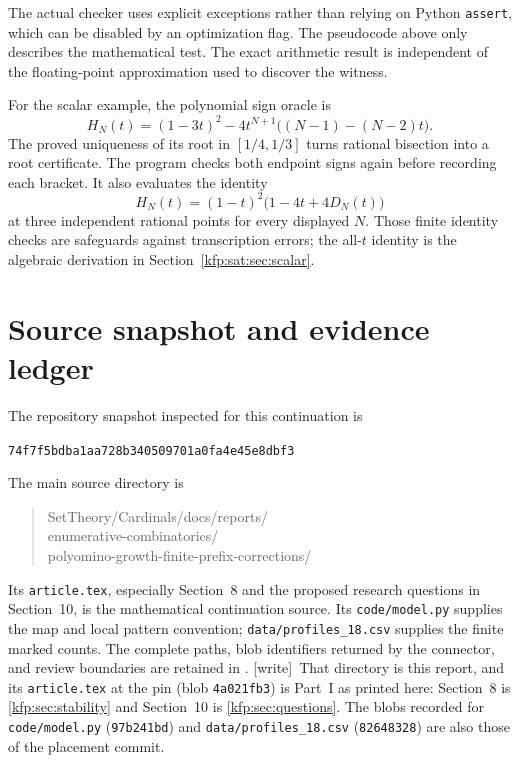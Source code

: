 \documentclass[11pt,a4paper]{article}
\theoremstyle{definition}
\theoremstyle{remark}
\newcommand{\wtag}{\textsf{\small[write]}}
\begin{document}
The actual checker uses explicit exceptions rather than relying on Python
\texttt{assert}, which can be disabled by an optimization flag. The
pseudocode above only describes the mathematical test. The exact
arithmetic result is independent of the floating-point approximation used
to discover the witness.

For the scalar example, the polynomial sign oracle is
\[
 H_N(t)=(1-3t)^2-4t^{N+1}\bigl((N-1)-(N-2)t\bigr).
\]
The proved uniqueness of its root in $[1/4,1/3]$ turns rational bisection
into a root certificate. The program checks both endpoint signs again
before recording each bracket. It also evaluates the identity
\[
 H_N(t)=(1-t)^2\bigl(1-4t+4D_N(t)\bigr)
\]
at three independent rational points for every displayed $N$. Those
finite identity checks are safeguards against transcription errors;
the all-$t$ identity is the algebraic derivation in
Section~\ref{kfp:sat:sec:scalar}.

\section{Source snapshot and evidence ledger}
\label{kfp:sat:app:sources}

The repository snapshot inspected for this continuation is
\begin{center}\small\texttt{74f7f5bdba1aa728b340509701a0fa4e45e8dbf3}\end{center}
The main source directory is
\begin{quote}\small\ttfamily
SetTheory/Cardinals/docs/reports/\\
enumerative-combinatorics/\\
polyomino-growth-finite-prefix-corrections/
\end{quote}
Its \texttt{article.tex}, especially Section~8 and the proposed research
questions in Section~10, is the mathematical continuation source. Its
\texttt{code/model.py} supplies the map and local pattern convention;
\texttt{data/profiles\_18.csv} supplies the finite marked counts.
The complete paths, blob identifiers returned by the connector, and
review boundaries are retained in .
\wtag\ That directory is this report, and its \texttt{article.tex} at the
pin (blob \texttt{4a021fb3}) is Part~I as printed here: Section~8 is
\cref{kfp:sec:stability} and Section~10 is \cref{kfp:sec:questions}. The
blobs recorded for \texttt{code/model.py} (\texttt{97b241bd}) and
\texttt{data/profiles\_18.csv} (\texttt{82648328}) are also those of the
placement commit.
\end{document}
